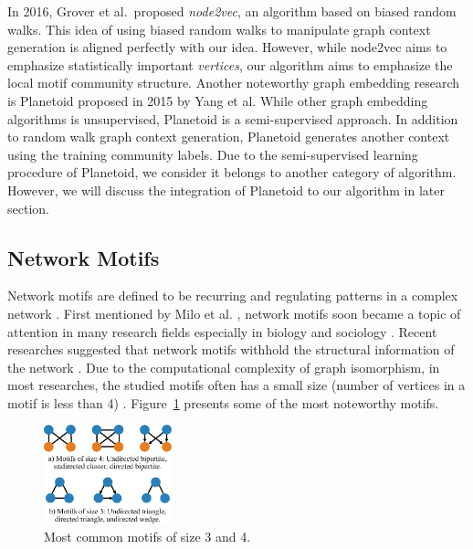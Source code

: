 \documentclass[letterpaper]{article}
\begin{document}
            In 2016, Grover et al.\ proposed \emph{node2vec}, an algorithm based on biased random
            walks. This idea of using biased random walks to manipulate graph context generation
            is aligned perfectly with our idea. However, while node2vec aims to emphasize statistically
            important \emph{vertices}, our algorithm aims to emphasize the local motif community
            structure. Another noteworthy graph embedding research is Planetoid \cite{planetoid} 
            proposed in 2015 by Yang et al. While other graph embedding algorithms is unsupervised, 
            Planetoid is a semi-supervised approach. In addition to random walk graph context generation, 
            Planetoid generates another context using the training community labels. Due to the
            semi-supervised learning procedure of Planetoid, we consider it belongs to another
            category of algorithm. However, we will discuss the integration of Planetoid to our
            algorithm in later section.

        \subsection{Network Motifs}

            Network motifs are defined to be recurring and regulating patterns in a complex network 
            \cite{netmotif}. First mentioned by Milo et al. \cite{motifblockmilo}, network motifs
            soon became a topic of attention in many research fields especially in biology and sociology
            \cite{masoudirev}. Recent researches suggested that network motifs withhold the structural 
            information of the network \cite{juremotif,deepgraphkernel}. Due to the
            computational complexity of graph isomorphism, in most researches, the studied motifs 
            often has a small size (number of vertices in a motif is less than 4) \cite{motifdecrev}.
            Figure~\ref{fig:motifs} presents some of the most noteworthy motifs.

            \begin{figure}
                \centering
                \includegraphics[width=0.33\textwidth]{fig7_motifs}
                \caption{Most common motifs of size 3 and 4.}
                \label{fig:motifs}
            \end{figure}
\end{document}
